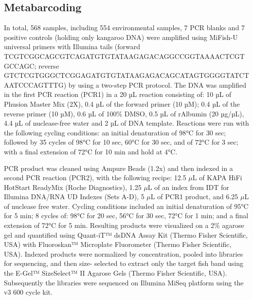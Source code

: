 \documentclass[9pt,twoside,lineno]{pnas-SI}
\begin{document}
\subsection*{Metabarcoding}
In total, 568 samples, including 554 environmental samples, 7 PCR blanks and 7 positive controls (holding only kangaroo DNA) were amplified using MiFish-U universal primers \cite{miya2015} with Illumina tails (forward TCGTCGGCAGCGTCAGATGTGTATAAGAGACAGGCCGGTAAAACTCGTGCCAGC; reverse GTCTCGTGGGCTCGGAGATGTGTATAAGAGACAGCATAGTGGGGTATCTAATCCCAGTTTG) by using a two-step PCR protocol. The DNA was amplified in the first PCR reaction (PCR1) in a 20 µL reaction consisting of: 10 µL of Phusion Master Mix (2X), 0.4 µL of the forward primer (10 µM); 0.4 µL of the reverse primer (10 µM), 0.6 µL of 100\% DMSO, 0.5 µL of rAlbumin (20 µg/µL), 4.4 µL of nuclease-free water and 2 µL of DNA template. Reactions were run with the following cycling conditions: an initial denaturation of 98°C for 30 sec; followed by 35 cycles of 98°C for 10 sec, 60°C for 30 sec, and of 72°C for 3 sec; with a final extension of 72°C for 10 min and hold at 4°C. 

PCR product was cleaned using Ampure Beads (1.2x) and then indexed in a second PCR reaction (PCR2), with the following recipe: 12.5 $\mu$L of KAPA HiFi HotStart ReadyMix (Roche Diagnostics), 1.25 $\mu$L of an index from IDT for Illumina DNA/RNA UD Indexes (Sets A-D), 5 $\mu$L of PCR1 product, and 6.25 $\mu$L of nuclease free water. Cycling conditions included an initial denaturation of 95°C for 5 min; 8 cycles of: 98°C for 20 sec, 56°C for 30 sec, 72°C for 1 min; and a final extension of 72°C for 5 min. Resulting products were visualized on a 2\% agarose gel and quantified using Quant-iT™ dsDNA Assay Kit (Thermo Fisher Scientific, USA) with Fluoroskan™ Microplate Fluorometer (Thermo Fisher Scientific, USA). Indexed products were normalized by concentration, pooled into libraries for sequencing, and then size- selected to extract only the target fish band using the E-Gel™ SizeSelect™ II Agarose Gels (Thermo Fisher Scientific, USA).  Subsequently the libraries were sequenced on Illumina MiSeq platform using the v3 600 cycle kit. 

\end{document}
